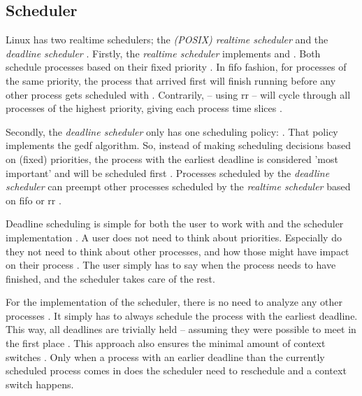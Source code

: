 \documentclass[10pt,twocolumn,a4paper]{article}
\begin{document}
\subsection{Scheduler}
Linux has two realtime schedulers; the \emph{(POSIX) realtime scheduler} and the \emph{deadline scheduler} \cite{bristot_de_oliveira_deadline_2018}.
Firstly, the \emph{realtime scheduler} implements  and  \cite{lf:scheduler}.
Both schedule processes based on their fixed priority \cite{lf:scheduler,de_oliveira_timing_2016}.
In \acrfull{fifo} fashion, for processes of the same priority, the process that arrived first will finish running before any other process gets scheduled with .
Contrarily,  -- using \acrfull{rr} -- will cycle through all processes of the highest priority, giving each process time slices \cite{bristot_de_oliveira_deadline_2018}.

Secondly, the \emph{deadline scheduler} only has one scheduling policy:  \cite{bristot_de_oliveira_deadline_2018}.
That policy implements the \acrfull{gedf} algorithm.
So, instead of making scheduling decisions based on (fixed) priorities, the process with the earliest deadline is considered 'most important' and will be scheduled first \cite{bristot_de_oliveira_deadline_2018}.
Processes scheduled by the \emph{deadline scheduler} can preempt other processes scheduled by the \emph{realtime scheduler} based on \acrshort{fifo} or \acrshort{rr} \cite{lf:scheduler}.

Deadline scheduling is simple for both the user to work with and the scheduler implementation \cite{bristot_de_oliveira_deadline_2018}.
A user does not need to think about priorities.
Especially do they not need to think about other processes, and how those might have impact on their process \cite{bristot_de_oliveira_deadline_2018}.
The user simply has to say when the process needs to have finished, and the scheduler takes care of the rest.

For the implementation of the scheduler, there is no need to analyze any other processes \cite{bristot_de_oliveira_deadline_2018}.
It simply has to always schedule the process with the earliest deadline.
This way, all deadlines are trivially held -- assuming they were possible to meet in the first place \cite{bristot_de_oliveira_deadline_2018}.
This approach also ensures the minimal amount of context switches \cite{bristot_de_oliveira_deadline_2018}.
Only when a process with an earlier deadline than the currently scheduled process comes in does the scheduler need to reschedule and a context switch happens.
\end{document}
